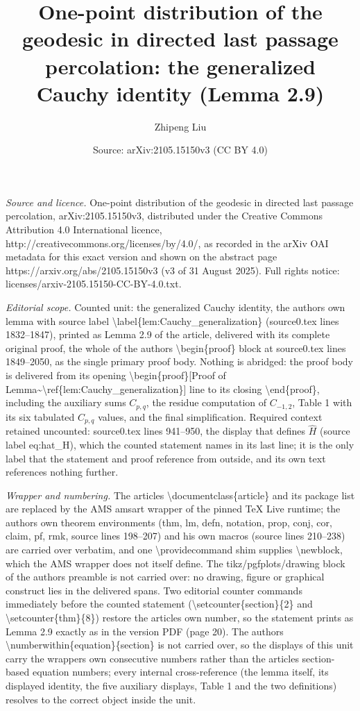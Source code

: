 \documentclass[10pt,a4paper]{amsart}
\title[One-point distribution of the geodesic in directed last passage percolation]{One-point distribution of the geodesic in directed last passage percolation: the generalized Cauchy identity (Lemma 2.9)}
\author{Zhipeng Liu}
\date{Source: arXiv:2105.15150v3 (CC BY 4.0)}
\begin{document}
\maketitle
\noindent\emph{Source and licence.} One-point distribution of the geodesic in directed last passage percolation, arXiv:2105.15150v3, distributed under the Creative Commons Attribution 4.0 International licence, http://creativecommons.org/licenses/by/4.0/, as recorded in the arXiv OAI metadata for this exact version and shown on the abstract page https://arxiv.org/abs/2105.15150v3 (v3 of 31 August 2025). Full rights notice: licenses/arxiv-2105.15150-CC-BY-4.0.txt.\par\smallskip
\noindent\textit{Editorial scope.} Counted unit: the generalized Cauchy identity, the author\textquotesingle s own lemma with source label \textbackslash{}label\{lem:Cauchy\_generalization\} (source0.tex lines 1832--1847), printed as Lemma 2.9 of the article, delivered with its complete original proof, the whole of the author\textquotesingle s \textbackslash{}begin\{proof\} block at source0.tex lines 1849--2050, as the single primary proof body. Nothing is abridged: the proof body is delivered from its opening \textbackslash{}begin\{proof\}[Proof of Lemma\textasciitilde{}\textbackslash{}ref\{lem:Cauchy\_generalization\}] line to its closing \textbackslash{}end\{proof\}, including the auxiliary sums $C_{p,q}$, the residue computation of $C_{-1,2}$, Table 1 with its six tabulated $C_{p,q}$ values, and the final simplification. Required context retained uncounted: source0.tex lines 941--950, the display that defines $\hat H$ (source label eq:hat\_H), which the counted statement names in its last line; it is the only label that the statement and proof reference from outside, and its own text references nothing further.\par
\noindent\textit{Wrapper and numbering.} The article\textquotesingle s \textbackslash{}documentclass\{article\} and its package list are replaced by the AMS amsart wrapper of the pinned TeX Live runtime; the author\textquotesingle s own theorem environments (thm, lm, defn, notation, prop, conj, cor, claim, pf, rmk, source lines 198--207) and his own macros (source lines 210--238) are carried over verbatim, and one \textbackslash{}providecommand shim supplies \textbackslash{}newblock, which the AMS wrapper does not itself define. The tikz/pgfplots/drawing block of the author\textquotesingle s preamble is not carried over: no drawing, figure or graphical construct lies in the delivered spans. Two editorial counter commands immediately before the counted statement (\textbackslash{}setcounter\{section\}\{2\} and \textbackslash{}setcounter\{thm\}\{8\}) restore the article\textquotesingle s own number, so the statement prints as Lemma 2.9 exactly as in the version PDF (page 20). The author\textquotesingle s \textbackslash{}numberwithin\{equation\}\{section\} is not carried over, so the displays of this unit carry the wrapper\textquotesingle s own consecutive numbers rather than the article\textquotesingle s section-based equation numbers; every internal cross-reference (the lemma itself, its displayed identity, the five auxiliary displays, Table 1 and the two definitions) resolves to the correct object inside the unit.\par
\end{document}

